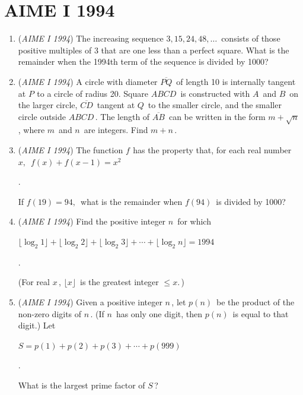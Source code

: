 \section{AIME I 1994}
        \begin{enumerate}
        	\item (\textit{AIME I 1994}) The increasing sequence $3, 15, 24, 48, \ldots\,$ consists of those positive multiples of 3 that are one less than a perfect square.  What is the remainder when the 1994th term of the sequence is divided by 1000?


 

	\item (\textit{AIME I 1994}) A circle with diameter $\overline{PQ}\,$ of length 10 is internally tangent at $P^{}_{}$ to a circle of radius 20. Square $ABCD\,$ is constructed with $A\,$ and $B\,$ on the larger circle, $\overline{CD}\,$ tangent at $Q\,$ to the smaller circle, and the smaller circle outside $ABCD\,$. The length of $\overline{AB}\,$ can be written in the form $m + \sqrt{n}\,$, where $m\,$ and $n\,$ are integers. Find $m + n\,$.


 

	\item (\textit{AIME I 1994}) The function $f_{}^{}$ has the property that, for each real number $x,\,$
$f(x)+f(x-1) = x^2\,$

 .


 If $f(19)=94,\,$ what is the remainder when $f(94)\,$ is divided by 1000?


 

	\item (\textit{AIME I 1994}) Find the positive integer $n\,$ for which


 $\lfloor \log_2{1}\rfloor+\lfloor\log_2{2}\rfloor+\lfloor\log_2{3}\rfloor+\cdots+\lfloor\log_2{n}\rfloor=1994$

 .


 (For real $x\,$, $\lfloor x\rfloor\,$ is the greatest integer $\le x.\,$)


 

	\item (\textit{AIME I 1994}) Given a positive integer $n\,$, let $p(n)\,$ be the product of the non-zero digits of $n\,$.  (If $n\,$ has only one digit, then $p(n)\,$ is equal to that digit.)  Let


 $S=p(1)+p(2)+p(3)+\cdots+p(999)$

 .


 What is the largest prime factor of $S\,$?



\end{enumerate}
